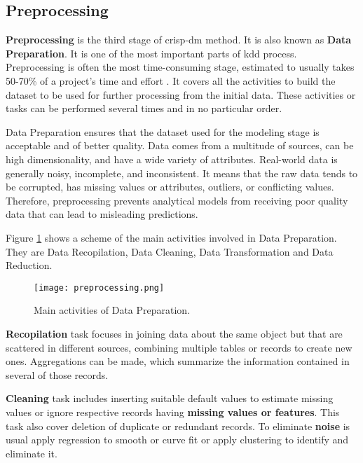 \subsection{Preprocessing}
\label{sec:preprocessing}

\textbf{Preprocessing} is the third stage of \acrshort{crisp-dm} method. It is also known as \textbf{Data Preparation}. It is one of the most important parts of \acrshort{kdd} process. Preprocessing is often the most time-consuming stage, estimated to usually takes 50-70\% of a project's time and effort \cite{preprocessing-time}. It covers all the activities to build the dataset to be used for further processing from the initial data. These activities or tasks can be performed several times and in no particular order.

Data Preparation ensures that the dataset used for the modeling stage is acceptable and of better quality. Data comes from a multitude of sources, can be high dimensionality, and have a wide variety of attributes. Real-world data is generally noisy, incomplete, and inconsistent. It means that the raw data tends to be corrupted, has missing values or attributes, outliers, or conflicting values. Therefore, preprocessing prevents analytical models from receiving poor quality data that can lead to misleading predictions.

Figure \ref{fig:preprocessing} shows a scheme of the main activities involved in Data Preparation. They are Data Recopilation, Data Cleaning, Data Transformation and Data Reduction.

\begin{figure}[H]
    \centering
    \texttt{[image: preprocessing.png]}
    \caption{Main activities of Data Preparation.}
    \label{fig:preprocessing}
\end{figure}

\textbf{Recopilation} task focuses in joining data about the same object but that are scattered in different sources, combining multiple tables or records to create new ones. Aggregations can be made, which summarize the information contained in several of those records.

\textbf{Cleaning} task includes inserting suitable default values to estimate missing values or ignore respective records having \textbf{missing values or features}. This task also cover deletion of duplicate or redundant records. To eliminate \textbf{noise} is usual apply regression to smooth or curve fit or apply clustering to identify and eliminate it.

